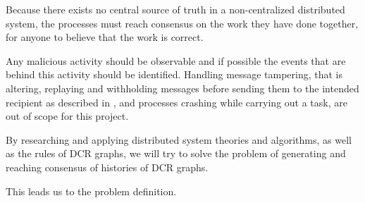 	\newpar Because there exists no central source of truth in a non-centralized distributed system, the processes must reach consensus on the work they have done together, for anyone to believe that the work is correct.
	
	Any malicious activity should be observable and if possible the events that are behind this activity should be identified. Handling message tampering, that is altering, replaying and withholding messages before sending them to the intended recipient as described in \cite{Coulouris:2011:DSC:2029110:chapter2}, and processes crashing while carrying out a task, are out of scope for this project.

	\newpar By researching and applying distributed system theories and algorithms, as well as the rules of DCR graphs, we will try to solve the problem of generating and reaching consensus of histories of DCR graphs.
	
	\newpar
	This leads us to the problem definition.